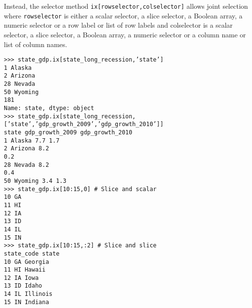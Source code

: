 \documentclass[KSmain.tex]{subfiles}
\begin{document}
\noindent Instead, the selector
method \texttt{ix[rowselector,colselector]} allows joint selection where \texttt{rowselector} is either a scalar selector, a
slice selector, a Boolean array, a numeric selector or a row label or list of row labels and colselector is a
scalar selector, a slice selector, a Boolean array, a numeric selector or a column name or list of column
names.
\begin{framed}
\begin{verbatim}
>>> state_gdp.ix[state_long_recession,’state’]
1 Alaska
2 Arizona
28 Nevada
50 Wyoming
181
Name: state, dtype: object
>>> state_gdp.ix[state_long_recession,[’state’,’gdp_growth_2009’,’gdp_growth_2010’]]
state gdp_growth_2009 gdp_growth_2010
1 Alaska 7.7 1.7
2 Arizona 8.2
0.2
28 Nevada 8.2
0.4
50 Wyoming 3.4 1.3
>>> state_gdp.ix[10:15,0] # Slice and scalar
10 GA
11 HI
12 IA
13 ID
14 IL
15 IN
>>> state_gdp.ix[10:15,:2] # Slice and slice
state_code state
10 GA Georgia
11 HI Hawaii
12 IA Iowa
13 ID Idaho
14 IL Illinois
15 IN Indiana
\end{verbatim}
\end{framed}
\newpage
\end{document}

